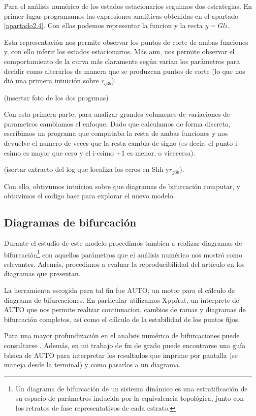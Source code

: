 Para el análisis numérico de los estados estacionarios seguimos dos estrategias. 
En primer lugar programamos las expresiones analíticas obtenidas en el apartado \ref{apartado2.4}. Con ellas podemos representar la funcion y la recta $y=Gli$. 

Esta representación nos permite observar los puntos de corte de ambas funciones y, con ello inferir los estados estacionarios. Más aun, nos permite observar el comportamiento de la curva más claramente según varían los parámetros para decidir como alterarlos de manera que se produzcan puntos de corte (lo que nos dió una primera intuición sobre $r_{g3b}$).

(insertar foto de los dos progrmas)

Con esta primera parte, para analizar grandes volumenes de variaciones de parametros cambiamos el enfoque. Dado que calculamos de forma discreta, escribimos un programa que computaba la resta de ambas funciones y nos devuelve el numero de veces que la resta cambia de signo (es decir, el punto i-esimo es mayor que cero y el i-esimo +1 es menor, o vicecersa).

(isertar extracto del log que localiza los ceros en Shh y$r_{g3b}$).

Con ello, obtivumos intuicion sobre que diagramas de bifurcación computar, y obtuvimos el codigo base para explorar el nuevo modelo.



\subsection{Diagramas de bifurcación}
Durante el estudio de este modelo procedimos tambien a realizar diagramas de bifurcación\footnote{Un diagrama de bifurcación de un sistema dinámico es una estratificación de su espacio de parámetros inducida por la equivalencia topológica, junto con los retratos de fase representativos de cada estrato.} con aquellos parámetros que el análisis numérico nos mostró como relevantes. Además, procedimos a evaluar la reproducibilidad del artículo en los diagramas que presentan. 

La herramienta escogida para tal fin  fue AUTO, un motor para el cálculo de diagrama de bifurcaciones. En particular utilizamos XppAut, un interprete de AUTO que nos permite realizar continuacion, cambios de ramas y diagramas de bifurcación completos, así como el cálculo de la estabilidad de los puntos fijos. 

Para una mayor profundización en el analisis numérico de bifurcaciones puede consultarse \cite{meijer2012numerical}. Además, en mi trabajo de fin de grado \cite{Yo} puede encontrarse una guía básica de AUTO para interpretar los resultados que imprime por pantalla (se maneja desde la terminal) y como pasarlos a un diagrama. 


